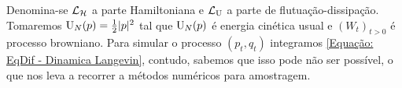Denomina-se $\operatorname{\mathcal{L}}_{\operatorname{\mathcal{H}}}$ a parte Hamiltoniana e $\operatorname{\mathcal{L}}_{\operatorname{U}}$ a parte de flutuação-dissipação. Tomaremos $\operatorname{U}_N(p) = \frac{1}{2} |p|^2$ tal que $\operatorname{U}_N(p)$ é energia cinética usual e $(W_t)_{t>0}$ é processo browniano. Para simular o processo $(p_t,q_t)$ integramos \ref{Equação: EqDif - Dinamica Langevin}, contudo, sabemos que isso pode não ser possível, o que nos leva a recorrer a métodos numéricos para amostragem.